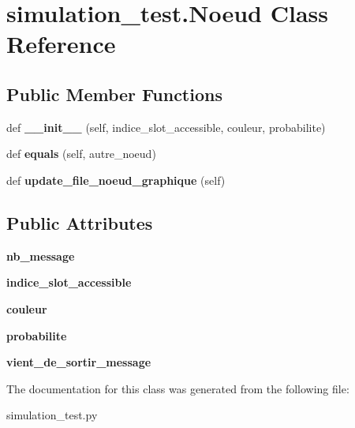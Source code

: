 \hypertarget{classsimulation__test_1_1Noeud}{}\section{simulation\+\_\+test.\+Noeud Class Reference}
\label{classsimulation__test_1_1Noeud}
\subsection*{Public Member Functions}
\begin{DoxyCompactItemize}
\item 
def {\bfseries \+\_\+\+\_\+init\+\_\+\+\_\+} (self, indice\+\_\+slot\+\_\+accessible, couleur, probabilite)\hypertarget{classsimulation__test_1_1Noeud_a47175db79a2200c5abc297e66a75dfd5}{}\label{classsimulation__test_1_1Noeud_a47175db79a2200c5abc297e66a75dfd5}

\item 
def {\bfseries equals} (self, autre\+\_\+noeud)\hypertarget{classsimulation__test_1_1Noeud_a2580283b354c62c39a9ae728a7c77135}{}\label{classsimulation__test_1_1Noeud_a2580283b354c62c39a9ae728a7c77135}

\item 
def {\bfseries update\+\_\+file\+\_\+noeud\+\_\+graphique} (self)\hypertarget{classsimulation__test_1_1Noeud_a97239b735c6728623397b00963a00a4c}{}\label{classsimulation__test_1_1Noeud_a97239b735c6728623397b00963a00a4c}

\end{DoxyCompactItemize}
\subsection*{Public Attributes}
\begin{DoxyCompactItemize}
\item 
{\bfseries nb\+\_\+message}\hypertarget{classsimulation__test_1_1Noeud_ad60ecbe883b2a6b9f42ebd76f56c47be}{}\label{classsimulation__test_1_1Noeud_ad60ecbe883b2a6b9f42ebd76f56c47be}

\item 
{\bfseries indice\+\_\+slot\+\_\+accessible}\hypertarget{classsimulation__test_1_1Noeud_aa2db8402d98bb284aa7eeee7fe2e3dc6}{}\label{classsimulation__test_1_1Noeud_aa2db8402d98bb284aa7eeee7fe2e3dc6}

\item 
{\bfseries couleur}\hypertarget{classsimulation__test_1_1Noeud_a6d0da1b5d45ff746dc7b6b7ff43987ed}{}\label{classsimulation__test_1_1Noeud_a6d0da1b5d45ff746dc7b6b7ff43987ed}

\item 
{\bfseries probabilite}\hypertarget{classsimulation__test_1_1Noeud_aa2fd57f2b8b86d732a542e600f07241e}{}\label{classsimulation__test_1_1Noeud_aa2fd57f2b8b86d732a542e600f07241e}

\item 
{\bfseries vient\+\_\+de\+\_\+sortir\+\_\+message}\hypertarget{classsimulation__test_1_1Noeud_a13723c2544b5c19ed0a3db9981dd445b}{}\label{classsimulation__test_1_1Noeud_a13723c2544b5c19ed0a3db9981dd445b}

\end{DoxyCompactItemize}


The documentation for this class was generated from the following file\+:\begin{DoxyCompactItemize}
\item 
simulation\+\_\+test.\+py\end{DoxyCompactItemize}
